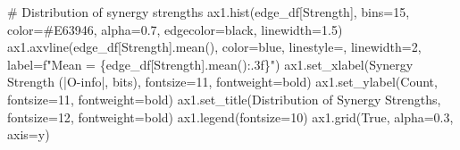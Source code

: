 \documentclass[
  11pt,
  letterpaper,
  oneside,
  openany]{book}
\newenvironment{Shaded}{\begin{snugshade}}{\end{snugshade}}
\newcommand{\CommentTok}[1]{\textcolor[rgb]{0.37,0.37,0.37}{#1}}
\newcommand{\DecValTok}[1]{\textcolor[rgb]{0.68,0.00,0.00}{#1}}
\newcommand{\FloatTok}[1]{\textcolor[rgb]{0.68,0.00,0.00}{#1}}
\newcommand{\NormalTok}[1]{\textcolor[rgb]{0.00,0.23,0.31}{#1}}
\newcommand{\OperatorTok}[1]{\textcolor[rgb]{0.37,0.37,0.37}{#1}}
\newcommand{\SpecialCharTok}[1]{\textcolor[rgb]{0.37,0.37,0.37}{#1}}
\newcommand{\SpecialStringTok}[1]{\textcolor[rgb]{0.13,0.47,0.30}{#1}}
\newcommand{\StringTok}[1]{\textcolor[rgb]{0.13,0.47,0.30}{#1}}
\newcommand{\VariableTok}[1]{\textcolor[rgb]{0.07,0.07,0.07}{#1}}
\begin{document}
\begin{Shaded}
\begin{Highlighting}[]
\CommentTok{\# Distribution of synergy strengths}
\NormalTok{ax1.hist(edge\_df[}\StringTok{\textquotesingle{}Strength\textquotesingle{}}\NormalTok{], bins}\OperatorTok{=}\DecValTok{15}\NormalTok{, color}\OperatorTok{=}\StringTok{\textquotesingle{}\#E63946\textquotesingle{}}\NormalTok{, }
\NormalTok{         alpha}\OperatorTok{=}\FloatTok{0.7}\NormalTok{, edgecolor}\OperatorTok{=}\StringTok{\textquotesingle{}black\textquotesingle{}}\NormalTok{, linewidth}\OperatorTok{=}\FloatTok{1.5}\NormalTok{)}
\NormalTok{ax1.axvline(edge\_df[}\StringTok{\textquotesingle{}Strength\textquotesingle{}}\NormalTok{].mean(), color}\OperatorTok{=}\StringTok{\textquotesingle{}blue\textquotesingle{}}\NormalTok{, linestyle}\OperatorTok{=}\StringTok{\textquotesingle{}{-}{-}\textquotesingle{}}\NormalTok{, }
\NormalTok{            linewidth}\OperatorTok{=}\DecValTok{2}\NormalTok{, label}\OperatorTok{=}\SpecialStringTok{f"Mean = }\SpecialCharTok{\{}\NormalTok{edge\_df[}\StringTok{\textquotesingle{}Strength\textquotesingle{}}\NormalTok{]}\SpecialCharTok{.}\NormalTok{mean()}\SpecialCharTok{:.3f\}}\SpecialStringTok{"}\NormalTok{)}
\NormalTok{ax1.set\_xlabel(}\StringTok{\textquotesingle{}Synergy Strength (|O{-}info|, bits)\textquotesingle{}}\NormalTok{, fontsize}\OperatorTok{=}\DecValTok{11}\NormalTok{, fontweight}\OperatorTok{=}\StringTok{\textquotesingle{}bold\textquotesingle{}}\NormalTok{)}
\NormalTok{ax1.set\_ylabel(}\StringTok{\textquotesingle{}Count\textquotesingle{}}\NormalTok{, fontsize}\OperatorTok{=}\DecValTok{11}\NormalTok{, fontweight}\OperatorTok{=}\StringTok{\textquotesingle{}bold\textquotesingle{}}\NormalTok{)}
\NormalTok{ax1.set\_title(}\StringTok{\textquotesingle{}Distribution of Synergy Strengths\textquotesingle{}}\NormalTok{, fontsize}\OperatorTok{=}\DecValTok{12}\NormalTok{, fontweight}\OperatorTok{=}\StringTok{\textquotesingle{}bold\textquotesingle{}}\NormalTok{)}
\NormalTok{ax1.legend(fontsize}\OperatorTok{=}\DecValTok{10}\NormalTok{)}
\NormalTok{ax1.grid(}\VariableTok{True}\NormalTok{, alpha}\OperatorTok{=}\FloatTok{0.3}\NormalTok{, axis}\OperatorTok{=}\StringTok{\textquotesingle{}y\textquotesingle{}}\NormalTok{)}


\end{Highlighting}
\end{Shaded}
\end{document}
